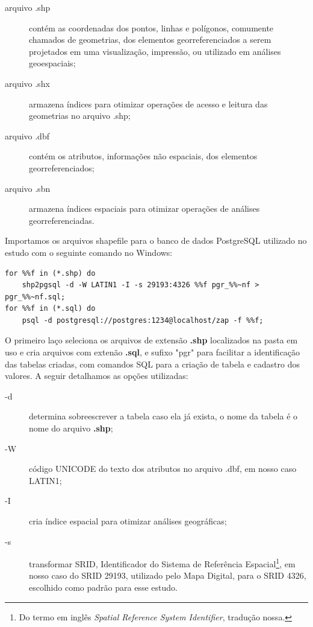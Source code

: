 \begin{description}
\item[arquivo .shp] contém as coordenadas dos pontos, linhas e polígonos, comumente chamados de geometrias, dos elementos georreferenciados a serem projetados em uma visualização, impressão, ou utilizado em análises geoespaciais;
\item[arquivo .shx] armazena índices para otimizar operações de acesso e leitura das geometrias no arquivo .shp;
\item[arquivo .dbf] contém os atributos, informações não espaciais, dos elementos georreferenciados;
\item[arquivo .sbn] armazena índices espaciais para otimizar operações de análises georreferenciadas.
\end{description}

Importamos os arquivos shapefile para o banco de dados PostgreSQL utilizado no estudo com o seguinte comando no Windows:

\begin{lstlisting}[language=command.com, float=htpb, caption=Importar \textit{shapefiles} para o banco de dados PostGIS., label=lst_importa_shp]
for %%f in (*.shp) do 
	shp2pgsql -d -W LATIN1 -I -s 29193:4326 %%f pgr_%%~nf > pgr_%%~nf.sql;
for %%f in (*.sql) do 
	psql -d postgresql://postgres:1234@localhost/zap -f %%f;
\end{lstlisting}

O primeiro laço seleciona os arquivos de extensão \textbf{.shp} localizados na pasta em uso e cria arquivos com extenão \textbf{.sql}, e sufixo "pgr" para facilitar a identificação das tabelas criadas, com comandos SQL para a criação de tabela e cadastro dos valores. A seguir detalhamos as opções utilizadas:

\begin{description}
\item[-d ] determina sobreescrever a tabela caso ela já exista, o nome da tabela é o nome do arquivo \textbf{.shp};
\item[-W ] código UNICODE do texto dos atributos no arquivo .dbf, em nosso caso LATIN1;
\item[-I ] cria índice espacial para otimizar análises geográficas;
\item[-s ] transformar SRID, Identificador do Sistema de Referência Espacial\footnote{Do termo em inglês \textit{Spatial Reference System Identifier}, tradução nossa.}, em nosso caso do SRID 29193, utilizado pelo Mapa Digital, para o SRID 4326, escolhido como padrão para esse estudo.
\end{description}


